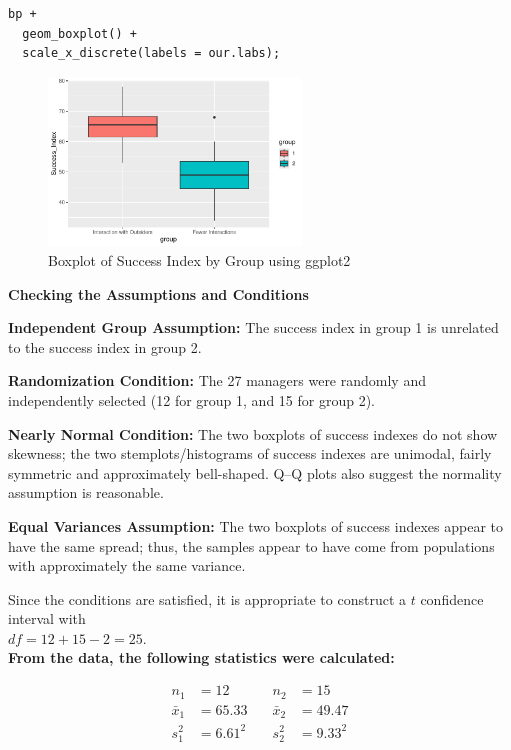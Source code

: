 \begin{example}
\begin{tcolorbox}[colback=gray!10, colframe=black!45, arc=2mm,
  before skip=4pt, after skip=4pt]
\begin{verbatim}
bp +
  geom_boxplot() +
  scale_x_discrete(labels = our.labs);
\end{verbatim}
\end{tcolorbox}
\begin{figure}[H]
\centering
\includegraphics[width=0.6\textwidth]{section14.1/images/boxplot_ggplot2.pdf}
\caption{Boxplot of Success Index by Group using ggplot2}
\label{fig:boxplot-ggplot}
\end{figure}
\noindent\textbf{Checking the Assumptions and Conditions}

\vspace{0.5em}

\noindent\textbf{Independent Group Assumption:} The success index in group 1 is unrelated to the success index in group 2.

\noindent\textbf{Randomization Condition:} The 27 managers were randomly and independently selected (12 for group 1, and 15 for group 2).

\noindent\textbf{Nearly Normal Condition:} The two boxplots of success indexes do not show skewness; the two stemplots/histograms of success indexes are unimodal, fairly symmetric and approximately bell-shaped. Q–Q plots also suggest the normality assumption is reasonable.

\noindent\textbf{Equal Variances Assumption:} The two boxplots of success indexes appear to have the same spread; thus, the samples appear to have come from populations with approximately the same variance.

\vspace{0.5em}

Since the conditions are satisfied, it is appropriate to construct a $t$ confidence interval with\\
$df = 12 + 15 - 2 = 25$. \\

\noindent\textbf{From the data, the following statistics were calculated:}

\[
\begin{aligned}
n_1 &= 12 &\quad n_2 &= 15 \\
\bar{x}_1 &= 65.33 &\quad \bar{x}_2 &= 49.47 \\
s_1^2 &= 6.61^2 &\quad s_2^2 &= 9.33^2
\end{aligned}
\]


\end{example}
